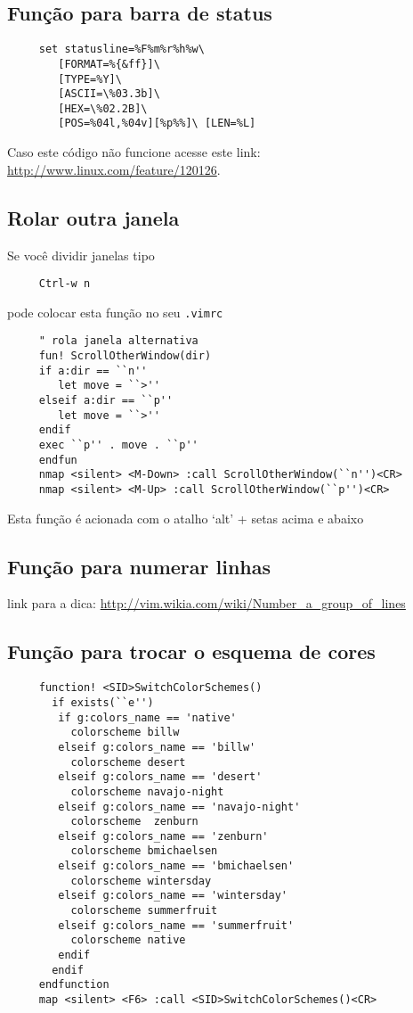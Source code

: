\subsection{Função para barra de status}\label{Função para barra de status}

\begin{verbatim}
     set statusline=%F%m%r%h%w\
        [FORMAT=%{&ff}]\
        [TYPE=%Y]\
        [ASCII=\%03.3b]\
        [HEX=\%02.2B]\
        [POS=%04l,%04v][%p%%]\ [LEN=%L]
\end{verbatim}
Caso este código não funcione acesse este link: \url{http://www.linux.com/feature/120126}.


\subsection{Rolar outra janela}\label{Rolar outra janela}

Se você dividir janelas tipo

\begin{verbatim}
     Ctrl-w n
\end{verbatim}

pode colocar esta função no seu \verb|.vimrc|

\begin{verbatim}
     " rola janela alternativa
     fun! ScrollOtherWindow(dir)
     if a:dir == ``n''
        let move = ``>''
     elseif a:dir == ``p''
        let move = ``>''
     endif
     exec ``p'' . move . ``p''
     endfun
     nmap <silent> <M-Down> :call ScrollOtherWindow(``n'')<CR>
     nmap <silent> <M-Up> :call ScrollOtherWindow(``p'')<CR>
\end{verbatim}

Esta função é acionada com o atalho `alt' + setas acima e abaixo

\subsection{Função para numerar linhas}\label{Função para numerar linhas}
link para a dica: \url{http://vim.wikia.com/wiki/Number_a_group_of_lines}

\subsection{Função para trocar o esquema de cores}

\begin{verbatim}
     function! <SID>SwitchColorSchemes()
       if exists(``e'')
        if g:colors_name == 'native'
          colorscheme billw
        elseif g:colors_name == 'billw'
          colorscheme desert
        elseif g:colors_name == 'desert'
          colorscheme navajo-night
        elseif g:colors_name == 'navajo-night'
          colorscheme  zenburn
        elseif g:colors_name == 'zenburn'
          colorscheme bmichaelsen
        elseif g:colors_name == 'bmichaelsen'
          colorscheme wintersday
        elseif g:colors_name == 'wintersday'
          colorscheme summerfruit
        elseif g:colors_name == 'summerfruit'
          colorscheme native
        endif
       endif
     endfunction
     map <silent> <F6> :call <SID>SwitchColorSchemes()<CR>
\end{verbatim}

